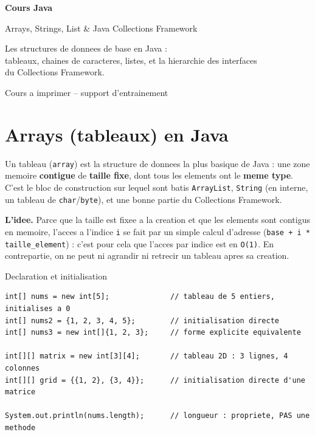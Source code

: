 \documentclass[11pt,a4paper]{article}
\begin{document}
\begin{titlepage}
\centering
\vspace*{3cm}
{\color{primary}\Huge\bfseries Cours Java\par}
\vspace{0.6cm}
{\color{accent}\LARGE Arrays, Strings, List \& Java Collections Framework\par}
\vspace{1.2cm}
{\large Les structures de donnees de base en Java :\\
tableaux, chaines de caracteres, listes, et la hierarchie des interfaces\\
du Collections Framework.\par}
\vfill
{\color{codecom}\large Cours a imprimer -- support d'entrainement\par}
\vspace{2cm}
\end{titlepage}

\tableofcontents
\newpage

\section{Arrays (tableaux) en Java}

Un tableau (\texttt{array}) est la structure de donnees la plus basique de Java :
une zone memoire \textbf{contigue} de \textbf{taille fixe}, dont tous les
elements ont le \textbf{meme type}. C'est le bloc de construction sur lequel
sont batis \texttt{ArrayList}, \texttt{String} (en interne, un tableau de
\texttt{char}/\texttt{byte}), et une bonne partie du Collections Framework.

\textbf{L'idee.} Parce que la taille est fixee a la creation et que les
elements sont contigus en memoire, l'acces a l'indice \texttt{i} se fait par un
simple calcul d'adresse (\texttt{base + i * taille\_element}) : c'est pour cela
que l'acces par indice est en \texttt{O(1)}. En contrepartie, on ne peut ni
agrandir ni retrecir un tableau apres sa creation.

\begin{infobox}{Declaration et initialisation}
\end{infobox}

\begin{lstlisting}
int[] nums = new int[5];              // tableau de 5 entiers, initialises a 0
int[] nums2 = {1, 2, 3, 4, 5};        // initialisation directe
int[] nums3 = new int[]{1, 2, 3};     // forme explicite equivalente

int[][] matrix = new int[3][4];       // tableau 2D : 3 lignes, 4 colonnes
int[][] grid = {{1, 2}, {3, 4}};      // initialisation directe d'une matrice

System.out.println(nums.length);      // longueur : propriete, PAS une methode
\end{lstlisting}
\end{document}
